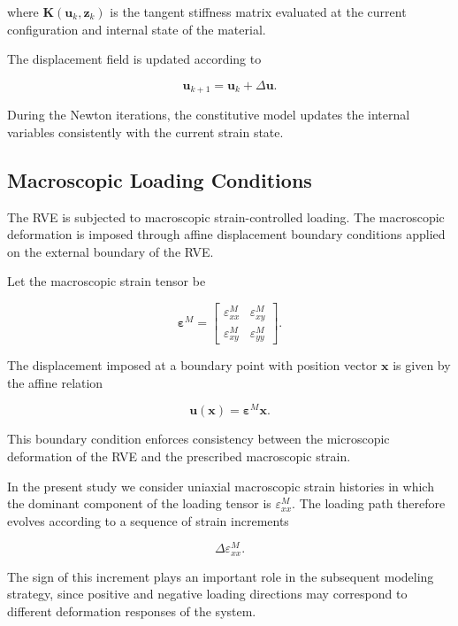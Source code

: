 \documentclass[11pt,a4paper]{article}
\begin{document}
where $\mathbf{K}(\mathbf{u}_k,\mathbf{z}_k)$ is the tangent stiffness matrix evaluated at the current configuration and internal state of the material.

The displacement field is updated according to

\begin{equation}
\mathbf{u}_{k+1} = \mathbf{u}_k + \Delta \mathbf{u}.
\end{equation}

During the Newton iterations, the constitutive model updates the internal variables consistently with the current strain state.
\subsection{Macroscopic Loading Conditions}

The RVE is subjected to macroscopic strain-controlled loading. The macroscopic deformation is imposed through affine displacement boundary conditions applied on the external boundary of the RVE.

Let the macroscopic strain tensor be

\begin{equation}
\boldsymbol{\varepsilon}^{M} =
\begin{bmatrix}
\varepsilon_{xx}^{M} & \varepsilon_{xy}^{M} \\
\varepsilon_{xy}^{M} & \varepsilon_{yy}^{M}
\end{bmatrix}.
\end{equation}

The displacement imposed at a boundary point with position vector $\mathbf{x}$ is given by the affine relation

\begin{equation}
\mathbf{u}(\mathbf{x}) = \boldsymbol{\varepsilon}^{M}\mathbf{x}.
\end{equation}

This boundary condition enforces consistency between the microscopic deformation of the RVE and the prescribed macroscopic strain.

In the present study we consider uniaxial macroscopic strain histories in which the dominant component of the loading tensor is $\varepsilon_{xx}^{M}$. The loading path therefore evolves according to a sequence of strain increments

\begin{equation}
\Delta \varepsilon_{xx}^{M}.
\end{equation}

The sign of this increment plays an important role in the subsequent modeling strategy, since positive and negative loading directions may correspond to different deformation responses of the system.
\end{document}
